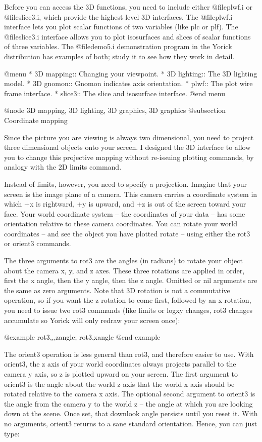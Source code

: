 Before you can access the 3D functions, you need to include either
@file{plwf.i} or @file{slice3.i}, which provide the highest level 3D
interfaces.  The @file{plwf.i} interface lets you plot scalar functions
of two variables (like plc or plf).  The @file{slice3.i} interface
allows you to plot isosurfaces and slices of scalar functions of three
variables.  The @file{demo5.i} demonstration program in the Yorick
distribution has examples of both; study it to see how they work in
detail.

@menu
* 3D mapping::                  Changing your viewpoint.
* 3D lighting::                 The 3D lighting model.
* 3D gnomon::                   Gnomon indicates axis orientation.
* plwf::                        The plot wire frame interface.
* slice3::                      The slice and isosurface interface.
@end menu

@node 3D mapping, 3D lighting, 3D graphics, 3D graphics
@subsection Coordinate mapping

Since the picture you are viewing is always two dimensional, you need
to project three dimensional objects onto your screen.  I designed the
3D interface to allow you to change this projective mapping without
re-issuing plotting commands, by analogy with the 2D limits command.

Instead of limits, however, you need to specify a projection.  Imagine
that your screen is the image plane of a camera.  This camera carries
a coordinate system in which +x is rightward, +y is upward, and +z is
out of the screen toward your face.  Your world coordinate system --
the coordinates of your data -- has some orientation relative to these
camera coordinates.  You can rotate your world coordinates -- and see
the object you have plotted rotate -- using either the rot3 or orient3
commands.

The three arguments to rot3 are the angles (in radians) to rotate your
object about the camera x, y, and z axes.  These three rotations are
applied in order, first the x angle, then the y angle, then the z
angle.  Omitted or nil arguments are the same as zero arguments.  Note
that 3D rotation is not a commutative operation, so if you want the z
rotation to come first, followed by an x rotation, you need to issue
two rot3 commands (like limits or logxy changes, rot3 changes
accumulate so Yorick will only redraw your screen once):

@example
rot3,,,zangle; rot3,xangle
@end example

The orient3 operation is less general than rot3, and therefore easier
to use.  With orient3, the z axis of your world coordinates always
projects parallel to the camera y axis, so z is plotted upward on your
screen.  The first argument to orient3 is the angle about the world z
axis that the world x axis should be rotated relative to the camera x
axis.  The optional second argument to orient3 is the angle from the
camera y to the world z -- the angle at which you are looking down at
the scene.  Once set, that downlook angle persists until you reset it.
With no arguments, orient3 returns to a sane standard orientation.
Hence, you can just type:

